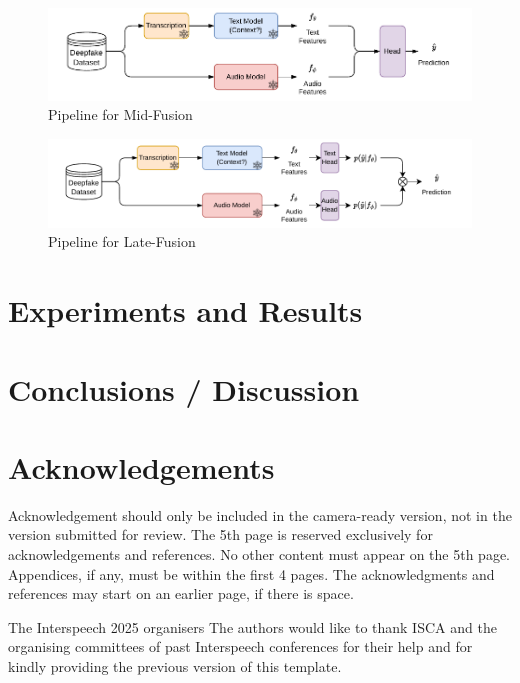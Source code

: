 \documentclass{Interspeech}
\begin{document}
\begin{figure}[t]
	\centering
	\includegraphics[width=1\textwidth]{figures/mid_fusion.pdf}
	\caption{Pipeline for Mid-Fusion}\label{fig:mid_fusion}
\end{figure}


\begin{figure}[t]
	\centering
	\includegraphics[width=1\textwidth]{figures/late_fusion.pdf}
	\caption{Pipeline for Late-Fusion}\label{fig:late_fusion}
\end{figure}

\section{Experiments and Results}
\label{sec:experiments_results}

\section{Conclusions / Discussion}
\label{sec:conclusions}

\section{Acknowledgements}
Acknowledgement should only be included in the camera-ready version, not in the
version submitted for review. The 5th page is reserved exclusively for
acknowledgements and references. No other content must appear on the 5th page.
Appendices, if any, must be within the first 4 pages. The acknowledgments and
references may start on an earlier page, if there is space.

\ifinterspeechfinal
  The Interspeech 2025 organisers
\else
  The authors
\fi
would like to thank ISCA and the organising committees of past Interspeech conferences for their help and for kindly providing the previous version of this template.



\end{document}
